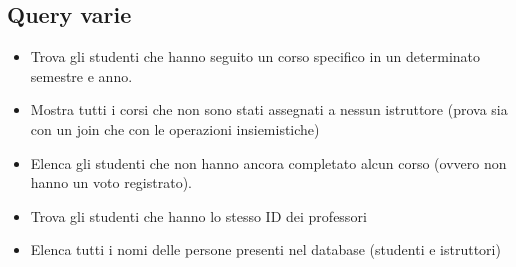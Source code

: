 \subsection{Query varie}
\begin{itemize}
	\item Trova gli studenti che hanno seguito un corso specifico in un determinato semestre e anno.
	\item Mostra tutti i corsi che non sono stati assegnati a nessun istruttore (prova sia con un join che con le operazioni insiemistiche)
	\item Elenca gli studenti che non hanno ancora completato alcun corso (ovvero non hanno un voto registrato).
	\item Trova gli studenti che hanno lo stesso ID dei professori
	\item Elenca tutti i nomi delle persone presenti nel database (studenti e istruttori)
\end{itemize}

